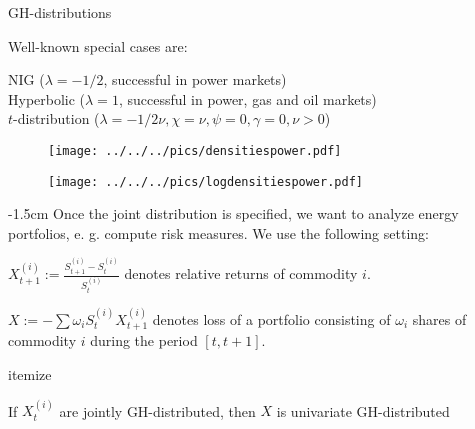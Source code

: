 


{GH-distributions}

Well-known special cases are:






	NIG ($\lambda=-1/2$, successful in power markets)\\[-1.5cm]


	Hyperbolic ($\lambda=1$, successful in power, gas and oil markets)\\[-1.5cm]


	$t$-distribution ($\lambda=-1/2\nu, \chi=\nu, \psi=0,
\gamma=0, \nu>0$)





{} %
\begin{center}
\begin{figure}
\texttt{[image: ../../../pics/densitiespower.pdf]}
\end{figure}
\end{center}

{} %
\begin{center}
\begin{figure}
\texttt{[image: ../../../pics/logdensitiespower.pdf]}
\end{figure}
\end{center}

{-1.5cm}
Once the joint distribution is specified, we want to analyze
energy portfolios, e. g. compute risk measures. We use the
following setting:






	$X_{t+1}^{(i)}:=\frac{S_{t+1}^{(i)}-S_t^{(i)}}{S_t^{(i)}}$
denotes relative returns of commodity $i$.

	
$X:=-\sum\omega_iS_t^{(i)}X_{t+1}^{(i)}$ denotes loss of a
portfolio consisting of $\omega_i$ shares of commodity $i$ during
the period $[t,t+1]$.





{itemize}


	If $X_t^{(i)}$ are jointly GH-distributed, then $X$ is
univariate GH-distributed

